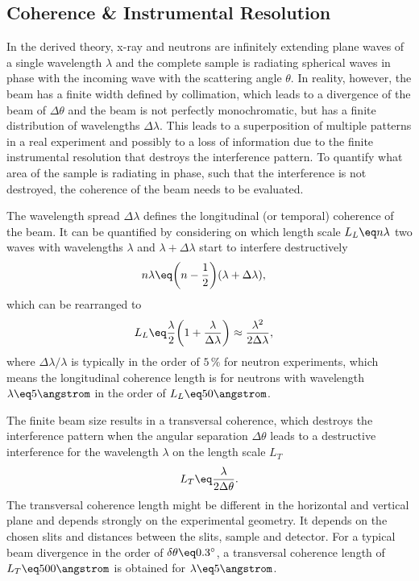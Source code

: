 \documentclass[\main/dresen_thesis.tex]{subfiles}
\begin{document}
\subsection{Coherence \& Instrumental Resolution}\label{sec:theoreticalBackground:scattering:CoherenceInstrumentalResolution}
In the derived theory, x-ray and neutrons are infinitely extending plane waves of a single wavelength $\lambda$ and the complete sample is radiating spherical waves in phase with the incoming wave with the scattering angle $\theta$.
In reality, however, the beam has a finite width defined by collimation, which leads to a divergence of the beam of $\Delta \theta$ and the beam is not perfectly monochromatic, but has a finite distribution of wavelengths $\Delta \lambda$.
This leads to a superposition of multiple patterns in a real experiment and possibly to a loss of information due to the finite instrumental resolution that destroys the interference pattern.
To quantify what area of the sample is radiating in phase, such that the interference is not destroyed, the coherence of the beam needs to be evaluated.

The wavelength spread $\Delta \lambda$ defines the longitudinal (or temporal) coherence of the beam. It can be quantified by considering on which length scale $L_L \eq n \lambda$ two waves with wavelengths $\lambda$ and $\lambda + \Delta \lambda$ start to interfere destructively
\begin{align}
  n\lambda \eq& \biggl(n - \frac{1}{2} \biggr)(\lambda + \Delta \lambda),
\end{align}
which can be rearranged to
\begin{align}
  L_L \eq& \frac{\lambda}{2} \biggl(1 + \frac{\lambda}{\Delta \lambda} \biggr) \approx \frac{\lambda^2}{2 \Delta \lambda},
\end{align}
where $\Delta \lambda / \lambda$ is typically in the order of $5\, \%$ for neutron experiments, which means the longitudinal coherence length is for neutrons with wavelength $\lambda \eq 5 \angstrom$ in the order of $L_L \eq 50 \angstrom$.

The finite beam size results in a transversal coherence, which destroys the interference pattern when the angular separation $\Delta \theta$ leads to a destructive interference for the wavelength $\lambda$ on the length scale $L_T$
\begin{align}
  L_T \eq \frac{\lambda}{2 \Delta\theta}.
\end{align}
The transversal coherence length might be different in the horizontal and vertical plane and depends strongly on the experimental geometry.
It depends on the chosen slits and distances between the slits, sample and detector.
For a typical beam divergence in the order of $\delta \theta \eq 0.3^\circ$, a transversal coherence length of $L_T \eq 500 \angstrom$ is obtained for $\lambda \eq 5 \angstrom$.
\end{document}
